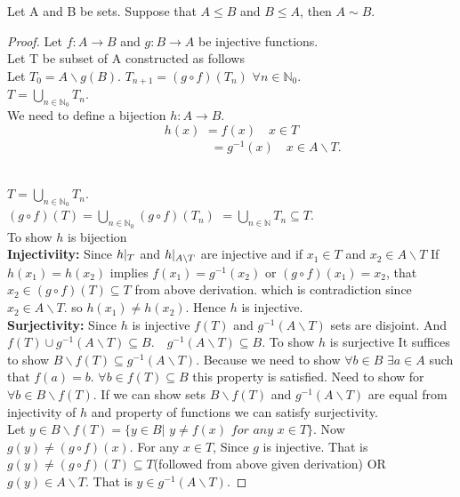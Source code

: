 \documentclass[a4paper,english,12pt]{article}   	%
\begin{document}
\begin{thm}
Let A and B be sets. Suppose that $A \leq B$ and $B \leq A$, then $A \sim B$.
\end{thm}
\begin{proof}
Let $f \colon A \to B$ and $g \colon B \to A$ be injective functions.\\
Let T be subset of A constructed as follows\\
Let $T_{0}=A \backslash g(B)$.
$T_{n+1}= (g \circ f)(T_{n})$ $\forall n \in \mathbb{N}_{0}$.\\
$T=\bigcup_{n \in \mathbb{N}_{0}} T_{n}$.\\
We need to define a bijection $h \colon A \to B$.\\
\[ h(x)\, \, = f(x)  \quad  x \in T \] 
$\qquad \qquad \qquad \qquad \qquad \qquad \qquad \qquad \, \,=g^{-1}(x) \quad  x \in A \backslash T$.
\begin{figure}[hhhh]
\centering
\scalebox{.8}{}
\caption{}
\label{Fig1}
\end{figure}
\\$T=\bigcup_{n \in \mathbb{N}_{0}} T_{n}$.\\
$(g \circ f)(T)=\bigcup_{n \in \mathbb{N}_{0}} (g \circ f)(T_{n})$
$= \bigcup _{n \in \mathbb{N}} T_{n} \subseteq T$.
\\To show $h$ is bijection\\
\textbf{Injectiviity:} Since $h \arrowvert _{T}$ and $h \arrowvert _{A \backslash T}$ are injective and if $x_{1} \in T$ and $x_{2} \in A \backslash T$ If $h(x_{1})=h(x_{2})$ implies $f(x_{1})=g^{-1}(x_{2})$ or $(g \circ f)(x_{1})=x_{2}$, that $x_{2} \in (g \circ f)(T) \subseteq T$ from above derivation. which is contradiction since  $x_{2} \in A \backslash T$. so $h(x_{1}) \neq h(x_{2})$. Hence $h$ is injective.\\
\textbf{Surjectivity:} 
Since $h$ is injective $f(T)$ and $g^{-1}(A \backslash T)$ sets  are disjoint. 
And $f(T) \cup g^{-1}(A \backslash T) \subseteq B$.\,\,\,\,\,\,$ g^{-1}(A \backslash T) \subseteq B$.
To show $h$ is surjective It suffices to show $B \backslash f(T) \subseteq g^{-1}(A \backslash T)$. Because we need to show $\forall b \in B$  $\exists a \in A$ such that $f(a)=b$.\,\,$\forall b \in f(T) \subseteq B$ this property is satisfied. Need to show for $\forall b \in B \backslash f(T)$.
If we can show sets $B \backslash f(T)$ and $g^{-1}(A \backslash T)$ are equal from injectivity of $h$ and property of functions we can satisfy surjectivity.\\
Let $y \in B \backslash f(T) = \{ y \in B |\, \,  y \neq f(x)\,\,   for \,\,  any \,\,  x \in T\}$. Now $g(y) \neq (g \circ f)(x)$. For any $x \in T$, Since $g$ is injective. That is $g(y) \neq (g \circ f)(T) \subseteq T$(followed from above given derivation)  OR $g(y) \in A \backslash T$. That is $y \in g^{-1}(A \backslash T)$.

\end{proof}
\end{document}
